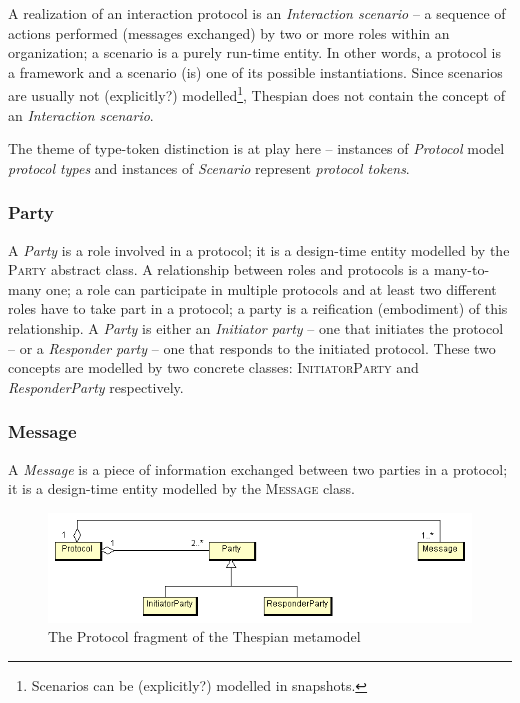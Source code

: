 A realization of an interaction protocol is an \textit{Interaction scenario} -- a sequence of actions performed (messages exchanged) by two or more roles within an organization; a scenario is a purely run-time entity.
In other words, a protocol is a framework and a scenario (is) one of its possible instantiations.
Since scenarios are usually not (explicitly?) modelled\footnote{Scenarios can be (explicitly?) modelled in snapshots.}, Thespian does not contain the concept of an \textit{Interaction scenario}.

The theme of type-token distinction is at play here -- instances of \textit{Protocol} model \textit{protocol types} and instances of \textit{Scenario} represent \textit{protocol tokens}.

\subsubsection*{Party}

A \textit{Party} is a role involved in a protocol; it is a design-time entity modelled by the \textsc{Party} abstract class.
A relationship between roles and protocols is a many-to-many one; a role can participate in multiple protocols and at least two different roles have to take part in a protocol; a party is a reification (embodiment) of this relationship.
A \textit{Party} is either an \textit{Initiator party} -- one that initiates the protocol -- or a \textit{Responder party} -- one that responds to the initiated protocol. These two concepts are modelled by two concrete classes: \textsc{InitiatorParty} and \textsl{ResponderParty} respectively.

\subsubsection*{Message}

A \textit{Message} is a piece of information exchanged between two parties in a protocol; it is a design-time entity modelled by the \textsc{Message} class.

\begin{figure}[ht]
	\centering
	\includegraphics[width=\textwidth]{images/thespian/protocol-metamodel.png}
	\caption{The Protocol fragment of the Thespian metamodel}
	\label{figure:thespian-protocol-metamodel}
\end{figure}

